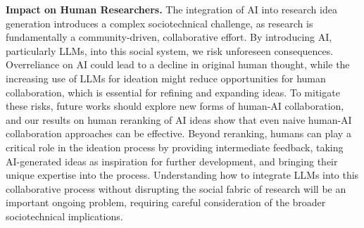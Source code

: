 \textbf{Impact on Human Researchers.}
The integration of AI into research idea generation introduces a complex sociotechnical challenge, as research is fundamentally a community-driven, collaborative effort. By introducing AI, particularly LLMs, into this social system, we risk unforeseen consequences. 
Overreliance on AI could lead to a decline in original human thought, while the increasing use of LLMs for ideation might reduce opportunities for human collaboration, which is essential for refining and expanding ideas.
%
To mitigate these risks, future works should explore new forms of human-AI collaboration, and our results on human reranking of AI ideas show that even naive human-AI collaboration approaches can be effective. Beyond reranking, humans can play a critical role in the ideation process by providing intermediate feedback, taking AI-generated ideas as inspiration for further development, and bringing their unique expertise into the process. %
%
Understanding how to integrate LLMs into this collaborative process without disrupting the social fabric of research will be an important ongoing problem, requiring careful consideration of the broader sociotechnical implications.







